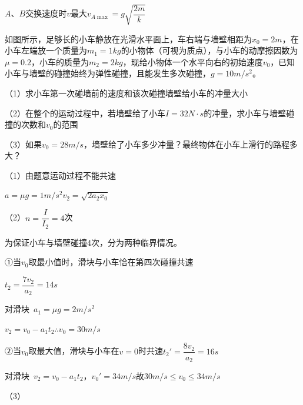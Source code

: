 $A$、$B$交换速度时$v$最大\quad $v_{A\max}=g\sqrt{\dfrac{2m}{k}}$
\begin{problem}[21，15分]
如图所示，足够长的小车静放在光滑水平面上，车右端与墙壁相距为$x_0=2\unit{m}$，在小车左端放一个质量为$m_1=1\unit{kg}$的小物体（可视为质点），与小车的动摩擦因数为$\mu=0.2$，小车的质量为$m_2=2\unit{kg}$，现给小物体一个水平向右的初始速度$v_0$，已知小车与墙壁的碰撞始终为弹性碰撞，且能发生多次碰撞，$g=10\unit{m/s^2}$。

（1）求小车第一次碰墙前的速度和该次碰撞墙壁给小车的冲量大小\ 

（2）在整个的运动过程中，若墙壁给了小车$I=32\unit{N\cdot s}$的冲量，求小车与墙壁碰撞的次数和$v_0$的范围\ 

（3）如果$v_0=28\unit{m/s}$，墙壁给了小车多少冲量？最终物体在小车上滑行的路程多大？\ %
\begin{solution}
（1）由题意运动过程不能共速

$a=\mu g=1\unit{m/s^2}$\quad $v_2=\sqrt{2a_2x_0}$%

（2）$n=\dfrac{I}{I_2}=4$次

为保证小车与墙壁碰撞4次，分为两种临界情况。

①当$v_0$取最小值时，滑块与小车恰在第四次碰撞共速

$t_2=\dfrac{7v_2}{a_2}=14\unit{s}$

对滑块\ $a_1=\mu g=2\unit{m/s^2}$\quad {}\quad {}

$v_2=v_0-a_1t_2$\quad $\therefore v_0=30\unit{m/s}$

②当$v_0$取最大值，滑块与小车在$v=0$时共速\quad $t_2'=\dfrac{8v_2}{a_2}=16\unit{s}$

对滑块\ $v_2=v_0-a_1t_2$，$v_0'=34\unit{m/s}$\quad 故$30\unit{m/s}\le v_0\le34\unit{m/s}$

（3）



\end{solution}
\end{problem}
